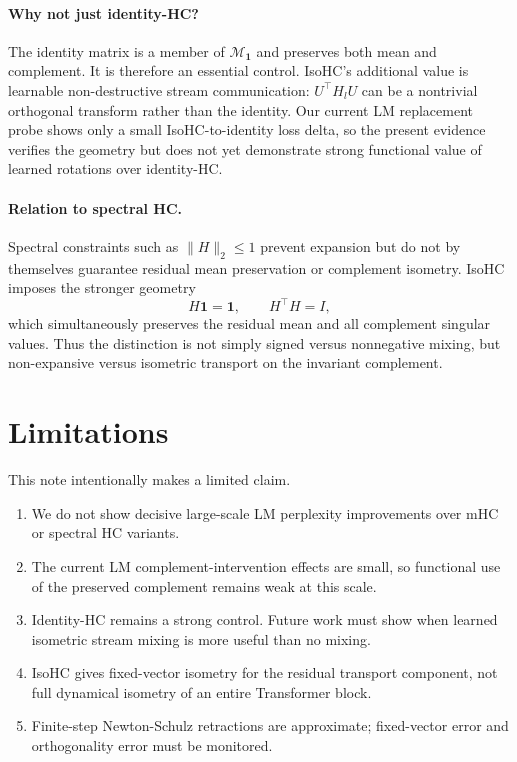\documentclass[10pt]{article}
\newcommand{\one}{\mathbf{1}}
\newcommand{\Mone}{\mathcal{M}_{\one}}
\begin{document}
\paragraph{Why not just identity-HC?}
The identity matrix is a member of $\Mone$ and preserves both mean and
complement.  It is therefore an essential control.  IsoHC's additional value is
learnable non-destructive stream communication: $U^\top H_lU$ can be a nontrivial
orthogonal transform rather than the identity.  Our current LM replacement probe
shows only a small IsoHC-to-identity loss delta, so the present evidence verifies
the geometry but does not yet demonstrate strong functional value of learned
rotations over identity-HC.

\paragraph{Relation to spectral HC.}
Spectral constraints such as $\|H\|_2\le 1$ prevent expansion but do not by
themselves guarantee residual mean preservation or complement isometry.  IsoHC
imposes the stronger geometry
\begin{equation}
    H\one=\one,\qquad H^\top H=I,
\end{equation}
which simultaneously preserves the residual mean and all complement singular
values.  Thus the distinction is not simply signed versus nonnegative mixing,
but non-expansive versus isometric transport on the invariant complement.

\section{Limitations}

This note intentionally makes a limited claim.
\begin{enumerate}
    \item We do not show decisive large-scale LM perplexity improvements over
    mHC or spectral HC variants.
    \item The current LM complement-intervention effects are small, so
    functional use of the preserved complement remains weak at this scale.
    \item Identity-HC remains a strong control.  Future work must show when
    learned isometric stream mixing is more useful than no mixing.
    \item IsoHC gives fixed-vector isometry for the residual transport
    component, not full dynamical isometry of an entire Transformer block.
    \item Finite-step Newton-Schulz retractions are approximate; fixed-vector
    error and orthogonality error must be monitored.
\end{enumerate}
\end{document}

